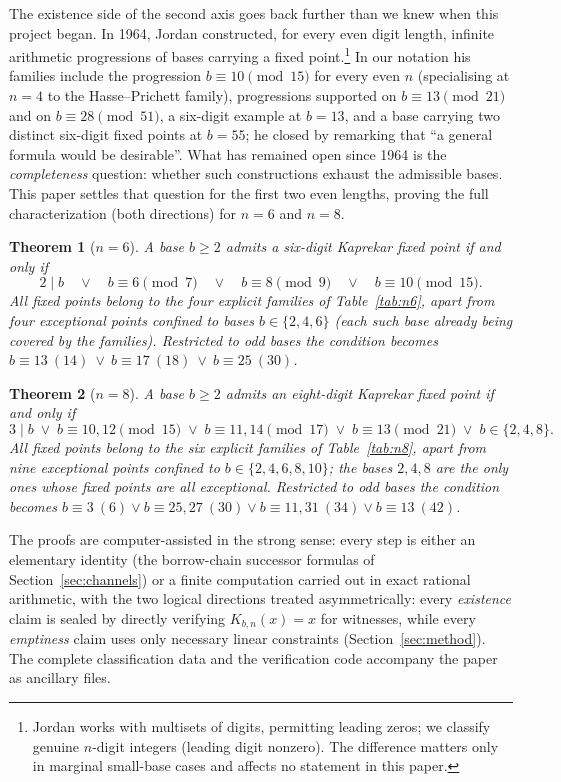 \documentclass[11pt]{amsart}
\newtheorem{theorem}{Theorem}
\theoremstyle{definition}
\begin{document}
The existence side of the second axis goes back further than we knew
when this project began. In 1964, Jordan \cite{Jordan64} constructed,
for every even digit length, infinite arithmetic progressions of bases
carrying a fixed point.\footnote{Jordan works with multisets of digits,
permitting leading zeros; we classify genuine $n$-digit integers
(leading digit nonzero). The difference matters only in marginal
small-base cases and affects no statement in this paper.} In our
notation his families include the progression $b\equiv 10\pmod{15}$
for every even $n$ (specialising at $n=4$ to the Hasse--Prichett
family), progressions supported on $b\equiv 13\pmod{21}$ and on
$b\equiv 28\pmod{51}$, a six-digit example at $b=13$, and a base
carrying two distinct six-digit fixed points at $b=55$; he closed by
remarking that ``a general formula would be desirable''. What has
remained open since 1964 is the \emph{completeness} question: whether
such constructions exhaust the admissible bases. This paper settles
that question for the first two even lengths, proving the full
characterization (both directions) for $n=6$ and $n=8$.

\begin{theorem}[$n=6$]\label{thm:n6}
A base $b\ge 2$ admits a six-digit Kaprekar fixed point if and only if
\[
2\mid b \quad\lor\quad b\equiv 6 \pmod 7 \quad\lor\quad
b\equiv 8 \pmod 9 \quad\lor\quad b\equiv 10 \pmod{15}.
\]
All fixed points belong to the four explicit families of
Table~\ref{tab:n6}, apart from four exceptional points confined to
bases $b\in\{2,4,6\}$ (each such base already being covered by the
families). Restricted to odd bases the condition becomes
$b\equiv 13\ (14)\ \lor\ b\equiv 17\ (18)\ \lor\ b\equiv 25\ (30)$.
\end{theorem}

\begin{theorem}[$n=8$]\label{thm:n8}
A base $b\ge 2$ admits an eight-digit Kaprekar fixed point if and only if
\[
3\mid b \;\lor\; b\equiv 10,12 \pmod{15} \;\lor\;
b\equiv 11,14 \pmod{17} \;\lor\; b\equiv 13 \pmod{21}
\;\lor\; b\in\{2,4,8\}.
\]
All fixed points belong to the six explicit families of
Table~\ref{tab:n8}, apart from nine exceptional points confined to
$b\in\{2,4,6,8,10\}$; the bases $2,4,8$ are the only ones whose fixed
points are all exceptional. Restricted to odd bases the condition becomes
$b\equiv 3\ (6) \lor b\equiv 25,27\ (30) \lor b\equiv 11,31\ (34) \lor
b\equiv 13\ (42)$.
\end{theorem}

The proofs are computer-assisted in the strong sense: every step is
either an elementary identity (the borrow-chain successor formulas of
Section~\ref{sec:channels}) or a finite computation carried out in exact
rational arithmetic, with the two logical directions treated
asymmetrically: every \emph{existence} claim is sealed by directly
verifying $K_{b,n}(x)=x$ for witnesses, while every \emph{emptiness}
claim uses only necessary linear constraints (Section~\ref{sec:method}).
The complete classification data and the verification code accompany the
paper as ancillary files.
\end{document}
